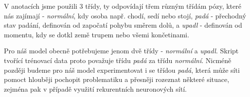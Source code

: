 V anotacích jsme použili 3 třídy, ty odpovídají třem různým třídám pózy, které
nás zajímají - \textit{normální}, kdy osoba např. chodí, sedí nebo stojí,
\textit{padá} - přechodný stav padání, definován od započatí pohybu směrem
dolů, a \textit{upadl} - definován od momentu, kdy se dotkl země trupem nebo
všemi končetinami.

Pro náš model obecně potřebujeme jenom dvě třídy - \textit{normální} a
\textit{upadl}. Skript tvořící trénovací data proto považuje třídu
\textit{padá} za třídu \textit{normální}. Nicméně později budeme pro náš model
experimentovat i se třídou \textit{padá}, která může síti pomoct hlouběji
pochopit problematiku a přesněji rozeznat některé situace, zejména pak v
případě využití rekurentních neuronových sítí.
